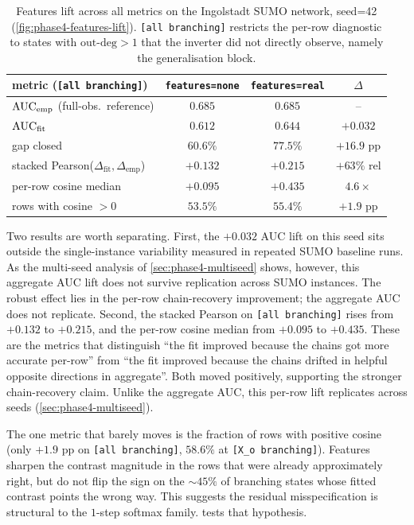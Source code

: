 \begin{table}[H]
\centering
\caption{Features lift across all metrics on the Ingolstadt SUMO network,
seed=42 (\cref{fig:phase4-features-lift}). \texttt{[all branching]}
restricts the per-row diagnostic to states with
$\mathrm{out\text{-}deg} > 1$ that the inverter did not directly
observe, namely the generalisation block.}
\label{tab:phase4-features}
\small
\begin{tabular}{lccc}
\toprule
metric (\texttt{[all branching]}) & \texttt{features=none} & \texttt{features=real} & $\Delta$ \\
\midrule
$\mathrm{AUC}_{\mathrm{emp}}$ (full-obs.\ reference) & $0.685$ & $0.685$ & -- \\
$\mathrm{AUC}_{\mathrm{fit}}$ & $0.612$ & $\mathbf{0.644}$ & $+0.032$ \\
gap closed & $60.6\%$ & $\mathbf{77.5\%}$ & $+16.9$ pp \\
stacked Pearson($\Delta_{\mathrm{fit}}, \Delta_{\mathrm{emp}}$) & $+0.132$ & $\mathbf{+0.215}$ & $+63\%$ rel \\
per-row cosine median & $+0.095$ & $\mathbf{+0.435}$ & $4.6\times$ \\
rows with cosine $> 0$ & $53.5\%$ & $55.4\%$ & $+1.9$ pp \\
\bottomrule
\end{tabular}
\end{table}

Two results are worth separating. First, the $+0.032$ AUC lift on this
seed sits outside the single-instance variability measured in repeated
SUMO baseline runs. As the multi-seed
analysis of \cref{sec:phase4-multiseed} shows, however, this aggregate
AUC lift does not survive replication across SUMO instances. The
robust effect lies in the per-row chain-recovery improvement; the aggregate
AUC does not replicate. Second, the stacked Pearson on \texttt{[all branching]}
rises from $+0.132$ to $+0.215$, and the per-row cosine median from
$+0.095$ to $+0.435$. These are the metrics
that distinguish ``the fit improved because the chains got more accurate
per-row'' from ``the fit improved because the chains drifted in helpful
opposite directions in aggregate''. Both moved positively, supporting the
stronger chain-recovery claim. Unlike the aggregate AUC, this per-row
lift replicates across seeds (\cref{sec:phase4-multiseed}).

The one metric that barely moves is the fraction of rows with positive
cosine (only $+1.9$ pp on \texttt{[all branching]}, $58.6\%$ at
\texttt{[X\_o branching]}). Features sharpen the contrast magnitude in
the rows that were already approximately right, but do not flip the
sign on the $\sim 45\%$ of branching states whose fitted contrast points
the wrong way. This suggests the residual misspecification is
structural to the $1$-step softmax family. 
tests that hypothesis.

